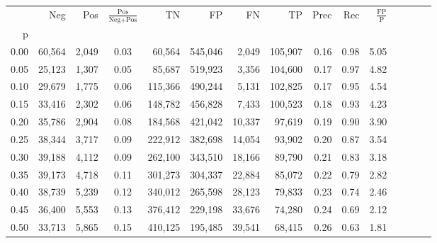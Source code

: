 \begin{tabular}{rrrcrrrrrrrrrrr}
\toprule
{} &     Neg &     Pos & $\frac{\text{Pos}}{\text{Neg}+\text{Pos}}$ &       TN &       FP &       FN &       TP &  Prec &   Rec & $\frac{\text{FP}}{\text{P}}$ \\
p    &         &         &                                            &          &          &          &          &       &       &                              \\
\midrule
0.00 &  60,564 &   2,049 &                                       0.03 &   60,564 &  545,046 &    2,049 &  105,907 &  0.16 &  0.98 &                         5.05 \\
0.05 &  25,123 &   1,307 &                                       0.05 &   85,687 &  519,923 &    3,356 &  104,600 &  0.17 &  0.97 &                         4.82 \\
0.10 &  29,679 &   1,775 &                                       0.06 &  115,366 &  490,244 &    5,131 &  102,825 &  0.17 &  0.95 &                         4.54 \\
0.15 &  33,416 &   2,302 &                                       0.06 &  148,782 &  456,828 &    7,433 &  100,523 &  0.18 &  0.93 &                         4.23 \\
0.20 &  35,786 &   2,904 &                                       0.08 &  184,568 &  421,042 &   10,337 &   97,619 &  0.19 &  0.90 &                         3.90 \\
0.25 &  38,344 &   3,717 &                                       0.09 &  222,912 &  382,698 &   14,054 &   93,902 &  0.20 &  0.87 &                         3.54 \\
0.30 &  39,188 &   4,112 &                                       0.09 &  262,100 &  343,510 &   18,166 &   89,790 &  0.21 &  0.83 &                         3.18 \\
0.35 &  39,173 &   4,718 &                                       0.11 &  301,273 &  304,337 &   22,884 &   85,072 &  0.22 &  0.79 &                         2.82 \\
0.40 &  38,739 &   5,239 &                                       0.12 &  340,012 &  265,598 &   28,123 &   79,833 &  0.23 &  0.74 &                         2.46 \\
0.45 &  36,400 &   5,553 &                                       0.13 &  376,412 &  229,198 &   33,676 &   74,280 &  0.24 &  0.69 &                         2.12 \\
0.50 &  33,713 &   5,865 &                                       0.15 &  410,125 &  195,485 &   39,541 &   68,415 &  0.26 &  0.63 &                         1.81 \\

\end{tabular}
